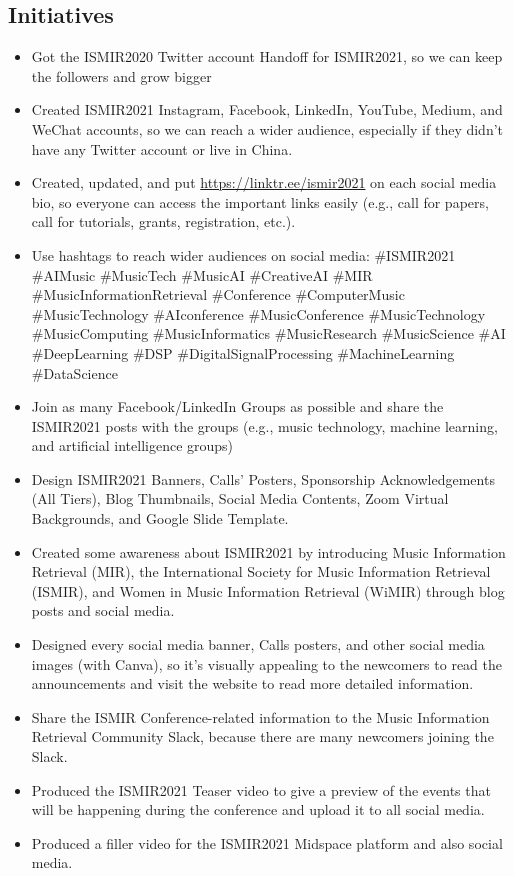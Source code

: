 \documentclass[%
10pt,								%
titlepage,						%
]
{scrartcl}
\begin{document}
    \subsection{Initiatives}
        \begin{itemize}
            \item   Got the ISMIR2020 Twitter account Handoff for ISMIR2021, so we can keep the followers and grow bigger
            \item   Created ISMIR2021 Instagram, Facebook, LinkedIn, YouTube, Medium, and WeChat accounts, so we can reach a wider audience, especially if they didn't have any Twitter account or live in China.
            \item   Created, updated, and put \href{https://linktr.ee/ismir2021}{https://linktr.ee/ismir2021} on each social media bio, so everyone can access the important links easily (e.g., call for papers, call for tutorials, grants, registration, etc.).
            \item   Use hashtags to reach wider audiences on social media: \#ISMIR2021 \#AIMusic \#MusicTech \#MusicAI \#CreativeAI \#MIR \#MusicInformationRetrieval \#Conference \#ComputerMusic \#MusicTechnology \#AIconference \#MusicConference \#MusicTechnology \#MusicComputing \#MusicInformatics \#MusicResearch \#MusicScience \#AI \#DeepLearning \#DSP \#DigitalSignalProcessing \#MachineLearning \#DataScience
            \item   Join as many Facebook/LinkedIn Groups as possible and share the ISMIR2021 posts with the groups (e.g., music technology, machine learning, and artificial intelligence groups)
            \item   Design ISMIR2021 Banners, Calls' Posters, Sponsorship Acknowledgements (All Tiers), Blog Thumbnails, Social Media Contents, Zoom Virtual Backgrounds, and Google Slide Template.
            \item   Created some awareness about ISMIR2021 by introducing Music Information Retrieval (MIR), the International Society for Music Information Retrieval (ISMIR), and Women in Music Information Retrieval (WiMIR) through blog posts and social media.
            \item   Designed every social media banner, Calls posters, and other social media images (with Canva), so it's visually appealing to the newcomers to read the announcements and visit the website to read more detailed information.
            \item   Share the ISMIR Conference-related information to the Music Information Retrieval Community Slack, because there are many newcomers joining the Slack.
            \item   Produced the ISMIR2021 Teaser video to give a preview of the events that will be happening during the conference and upload it to all social media.
            \item   Produced a filler video for the ISMIR2021 Midspace platform and also social media.
        \end{itemize}
        
\end{document}
